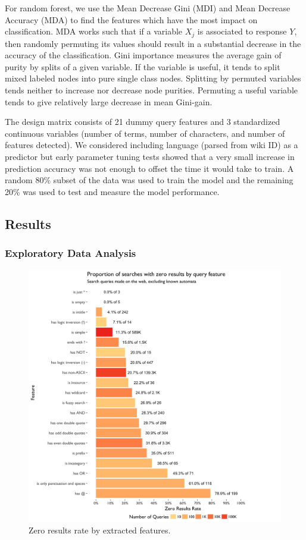 \documentclass[12pt,]{article}
\begin{document}
For random forest, we use the Mean Decrease Gini (MDI) and Mean Decrease
Accuracy (MDA) to find the features which have the most impact on
classification. MDA works such that if a variable \(X_j\) is associated
to response \(Y\), then randomly permuting its values should result in a
substantial decrease in the accuracy of the classification. Gini
importance measures the average gain of purity by splits of a given
variable. If the variable is useful, it tends to split mixed labeled
nodes into pure single class nodes. Splitting by permuted variables
tends neither to increase nor decrease node purities. Permuting a useful
variable tends to give relatively large decrease in mean Gini-gain.

The design matrix consists of 21 dummy query features and 3 standardized
continuous variables (number of terms, number of characters, and number
of features detected). We considered including language (parsed from
wiki ID) as a predictor but early parameter tuning tests showed that a
very small increase in prediction accuracy was not enough to offset the
time it would take to train. A random 80\% subset of the data was used
to train the model and the remaining 20\% was used to test and measure
the model performance.

\newpage

\subsection{Results}\label{results}

\subsubsection{Exploratory Data
Analysis}\label{exploratory-data-analysis}

\begin{figure}[htbp]
\centering
\includegraphics{figures/zrr_by_feature.png}
\caption{Zero results rate by extracted features.}
\end{figure}
\end{document}
